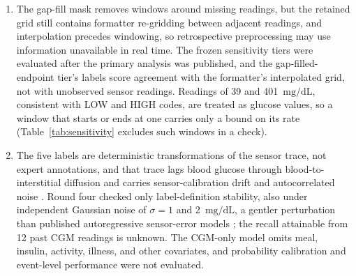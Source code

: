 \documentclass[10pt,twocolumn]{article}
\newcommand{\mgdl}{\ensuremath{\mathrm{mg/dL}}}
\begin{document}
\begin{enumerate}
    every round selected on its validation windows; rounds one to three
    read its held-out and temporal labels; round four's arm choice, an
    AI-generated review's offset scan and later revisions' re-analyses
    reread them descriptively; and round five reports them again as
    non-gating secondaries (Table~\ref{tab:readledger}). Gate outcomes in
    rounds two and three were decided by the chosen seed
    (Table~\ref{tab:seedgates}). Round five is an artifact-level ship
    decision between two artifacts (Section~\ref{sec:sweep5}): the
    winner's validation numbers are selection-biased, its RT-CGM gain
    moves recall from the slow to the fast classes with lower macro-F1 and
    QWK on all four read components, RT-CGM's rate labels may be distorted
    (Appendix~\ref{app:cohorts}), and the five-seed RT-CGM comparison that
    could credit the flatten head
    or the cosine schedule was not run. No round had evaluated RT-CGM
    labels before, though a rejected round-three arm trained on it.
    \item The gap-fill mask removes windows around missing readings, but
    the retained grid still contains formatter re-gridding between
    adjacent readings, and interpolation precedes windowing, so
    retrospective preprocessing may use information unavailable in real
    time. The frozen sensitivity tiers were evaluated after the primary
    analysis was published, and the gap-filled-endpoint tier's labels
    score agreement with the formatter's interpolated grid, not with
    unobserved sensor readings. Readings of 39 and 401~\mgdl, consistent
    with LOW and HIGH codes, are treated as glucose values, so a window
    that starts or ends at one carries only a bound on its rate
    (Table~\ref{tab:sensitivity} excludes such windows in a check).
    \item The five labels are deterministic transformations of the
    sensor trace, not expert annotations, and that trace lags blood
    glucose through blood-to-interstitial diffusion and carries
    sensor-calibration drift and autocorrelated noise \cite{facchinetti2014sensor}.
    Round four checked only label-definition stability, also under
    independent Gaussian noise of $\sigma=1$ and 2~\mgdl, a gentler
    perturbation than published autoregressive sensor-error models
    \cite{facchinetti2014sensor}; the recall attainable from 12 past CGM
    readings is unknown. The CGM-only model omits meal, insulin, activity,
    illness, and other covariates, and probability calibration and
    event-level performance were not evaluated.

\end{enumerate}
\end{document}
